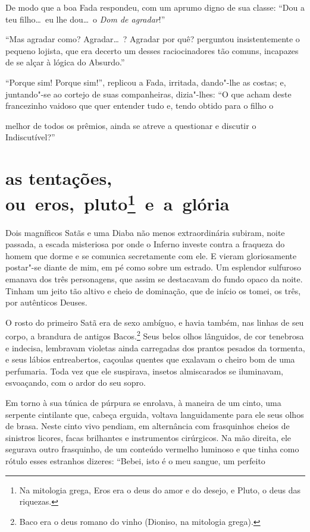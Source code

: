 De modo que a boa Fada respondeu, com um aprumo digno de sua classe:
``Dou a teu filho\ldots\  eu lhe dou\ldots\  o \textit{Dom de
agradar}!''

``Mas agradar como? Agradar\ldots\ ? Agradar por quê? perguntou insistentemente 
o pequeno lojista, que era decerto um desses
raciocinadores tão comuns, incapazes de se alçar à lógica do
Absurdo.''

``Porque sim! Porque sim!'', replicou a Fada,
irritada, dando"-lhe as costas; e, juntando"-se ao cortejo de suas
companheiras, dizia"-lhes: ``O que acham deste
francezinho vaidoso que quer entender tudo e, tendo obtido para o filho o 

\quebra

\noindent{}melhor de todos os prêmios, ainda se atreve a questionar e discutir o
Indiscutível?''

\quebra\section[As tentações, ou eros, pluto e a grória]{as tentações, ou~eros,~pluto\protect\footnote{ Na mitologia 
grega, Eros era o deus do amor e do desejo, e Pluto, o deus das riquezas.}~e~a~glória}

Dois magníficos Satãs e uma Diaba não menos extraordinária subiram,
noite passada, a escada misteriosa por onde o Inferno investe contra a
fraqueza do homem que dorme e se comunica secretamente com ele. E 
vieram gloriosamente postar"-se diante de mim, em pé como sobre um
estrado. Um esplendor sulfuroso emanava dos três personagens, que
assim se destacavam do fundo opaco da noite. Tinham um jeito tão altivo
e cheio de dominação, que de início os tomei, os três, por autênticos Deuses.

O rosto do primeiro Satã era de sexo ambíguo, e havia também, nas linhas
de seu corpo, a brandura de antigos Bacos.\protect\footnote{ Baco era o deus 
romano do vinho (Dioniso, na mitologia grega).}
Seus belos olhos lânguidos, de cor tenebrosa e indecisa, lembravam
violetas ainda carregadas dos prantos pesados da tormenta, e seus
lábios entreabertos, caçoulas quentes que exalavam o cheiro
bom de uma perfumaria. Toda vez que ele suspirava, insetos
almiscarados se iluminavam, esvoaçando, com o ardor do seu sopro.

Em torno à sua túnica de púrpura se enrolava, à maneira de um cinto,
uma serpente cintilante que, cabeça erguida, voltava
languidamente para ele seus olhos de brasa. Neste cinto vivo pendiam, em alternância com frasquinhos cheios de sinistros licores,
facas brilhantes e instrumentos cirúrgicos. Na mão direita, ele segurava
outro frasquinho, de um conteúdo vermelho luminoso e que
tinha como rótulo esses estranhos dizeres: ``Bebei,
isto é o meu sangue, um perfeito

